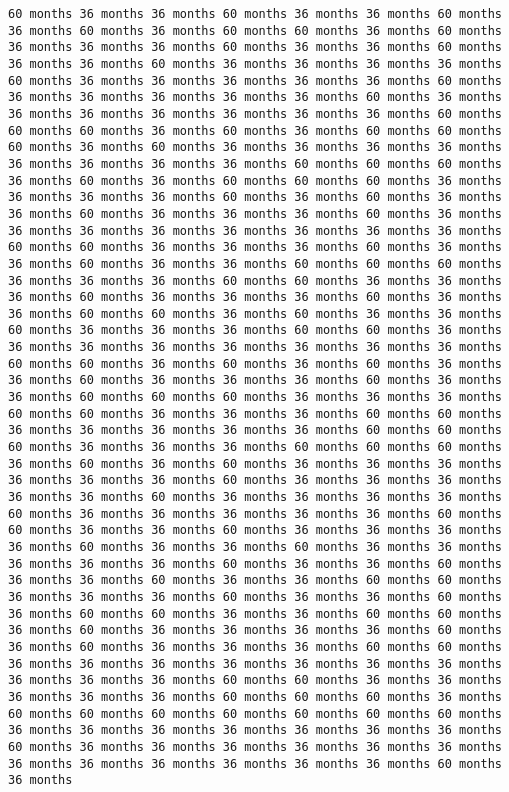 \documentclass[11pt]{article}
\begin{document}
\begin{Verbatim}[commandchars=\\\{\}, frame=single, framerule=2mm, rulecolor=\color{outerrorbackground}]
60 months 36 months 36 months 60 months 36 months 36 months 60 months 36 months 60 months 36 months 60 months 60 months 36 months 60 months 36 months 36 months 36 months 60 months 36 months 36 months 60 months 36 months 36 months 60 months 36 months 36 months 36 months 36 months 60 months 36 months 36 months 36 months 36 months 36 months 60 months 36 months 36 months 36 months 36 months 36 months 60 months 36 months 36 months 36 months 36 months 36 months 36 months 36 months 60 months 60 months 60 months 36 months 60 months 36 months 60 months 60 months 60 months 36 months 60 months 36 months 36 months 36 months 36 months 36 months 36 months 36 months 36 months 60 months 60 months 60 months 36 months 60 months 36 months 60 months 60 months 60 months 36 months 36 months 36 months 36 months 60 months 36 months 60 months 36 months 36 months 60 months 36 months 36 months 36 months 60 months 36 months 36 months 36 months 36 months 36 months 36 months 36 months 36 months 60 months 60 months 36 months 36 months 36 months 60 months 36 months 36 months 60 months 36 months 36 months 60 months 60 months 60 months 36 months 36 months 36 months 60 months 60 months 36 months 36 months 36 months 60 months 36 months 36 months 36 months 60 months 36 months 36 months 60 months 60 months 36 months 60 months 36 months 36 months 60 months 36 months 36 months 36 months 60 months 60 months 36 months 36 months 36 months 36 months 36 months 36 months 36 months 36 months 60 months 60 months 36 months 60 months 36 months 60 months 36 months 36 months 60 months 36 months 36 months 36 months 60 months 36 months 36 months 60 months 60 months 60 months 36 months 36 months 36 months 60 months 60 months 36 months 36 months 36 months 60 months 60 months 36 months 36 months 36 months 36 months 36 months 60 months 60 months 60 months 36 months 36 months 36 months 60 months 60 months 60 months 36 months 60 months 36 months 60 months 36 months 36 months 36 months 36 months 36 months 36 months 60 months 36 months 36 months 36 months 36 months 36 months 60 months 36 months 36 months 36 months 36 months 60 months 36 months 36 months 36 months 36 months 36 months 60 months 60 months 36 months 36 months 60 months 36 months 36 months 36 months 36 months 60 months 36 months 36 months 60 months 36 months 36 months 36 months 36 months 36 months 60 months 36 months 36 months 60 months 36 months 36 months 60 months 36 months 36 months 60 months 60 months 36 months 36 months 36 months 60 months 36 months 36 months 60 months 36 months 60 months 60 months 36 months 36 months 60 months 60 months 36 months 60 months 36 months 36 months 36 months 36 months 60 months 36 months 60 months 36 months 36 months 36 months 60 months 60 months 36 months 36 months 36 months 36 months 36 months 36 months 36 months 36 months 36 months 36 months 60 months 60 months 36 months 36 months 36 months 36 months 36 months 60 months 60 months 60 months 36 months 60 months 60 months 60 months 60 months 60 months 60 months 60 months 36 months 36 months 36 months 36 months 36 months 36 months 36 months 60 months 36 months 36 months 36 months 36 months 36 months 36 months 36 months 36 months 36 months 36 months 36 months 36 months 60 months 36 months 
\end{Verbatim}
\end{document}
